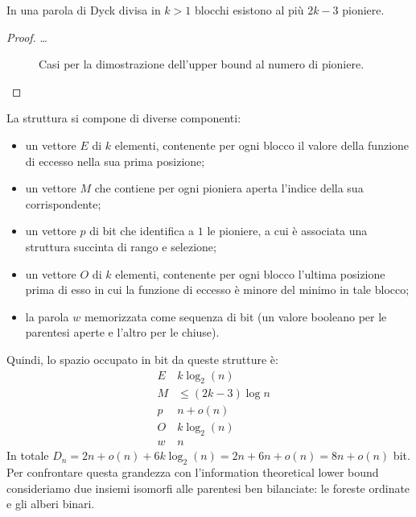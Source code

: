 \begin{theorem}
	In una parola di Dyck divisa in $k>1$ blocchi esistono al più $2k-3$ pioniere.
\end{theorem}
\begin{proof}
	\dots

	\begin{figure}[ht]
		\centering
		\begin{subfigure}{0.45\textwidth}
			\centering
			
		\end{subfigure}
		\hfill
		\begin{subfigure}{0.45\textwidth}
			\centering
			
		\end{subfigure}
		\caption{Casi per la dimostrazione dell'upper bound al numero di pioniere.}
		\label{fig:proof_pioneers}
	\end{figure}
\end{proof}

La struttura si compone di diverse componenti:
\begin{itemize}
	\item un vettore $E$ di $k$ elementi, contenente per ogni blocco il valore della funzione di eccesso nella sua prima posizione;
	\item un vettore $M$ che contiene per ogni pioniera aperta l'indice della sua corrispondente;
	\item un vettore $p$ di bit che identifica a $1$ le pioniere, a cui è associata una struttura succinta di rango e selezione;
	\item un vettore $O$ di $k$ elementi, contenente per ogni blocco l'ultima posizione prima di esso in cui la funzione di eccesso è minore del minimo in tale blocco;
	\item la parola $w$ memorizzata come sequenza di bit (un valore booleano per le parentesi aperte e l'altro per le chiuse).
\end{itemize}


Quindi, lo spazio occupato in bit da queste strutture è:
\begin{equation*}
	\begin{aligned}
		 & E & k  \log_2(n)      \\
		 & M & \leq (2k-3)\log n \\
		 & p & n + o(n)          \\
		 & O & k  \log_2(n)      \\
		 & w & n
	\end{aligned}
\end{equation*}
In totale $D_n = 2n + o(n) + 6k \log_2(n) = 2n + 6n + o(n) = 8n + o(n)$ bit. Per confrontare questa grandezza con l'information theoretical lower bound consideriamo due insiemi isomorfi alle parentesi ben bilanciate: le foreste ordinate e gli alberi binari.


